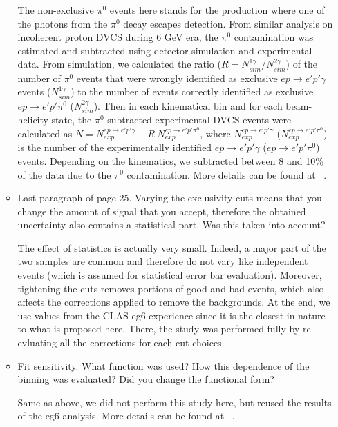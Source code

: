 \begin{itemize}
\begin{itemize}
      {\color{red} The non-exclusive $\pi^0$ events here stands for the 
      production where one of the photons from the $\pi^0$ decay escapes 
      detection. From similar analysis on incoherent proton DVCS during 6 GeV 
      era, the $\pi^0$ contamination was estimated and subtracted using 
      detector simulation and experimental data. From simulation, we calculated 
      the ratio ($R = N^{1\gamma}_{sim}/N^{2\gamma}_{sim}$) of the number of 
      $\pi^0$ events that were wrongly identified as exclusive $ep\rightarrow 
      e'p'\gamma$ events ($N^{1\gamma}_{sim}$) to the number of events 
      correctly identified as exclusive $ep\rightarrow e'p'\pi^0$ 
      ($N^{2\gamma}_{sim}$).  Then in each kinematical bin and for each 
      beam-helicity state, the $\pi^0$-subtracted experimental DVCS events were 
      calculated as $N = N^{ep\rightarrow e'p'\gamma}_{exp}- R~N^{ep\rightarrow 
      e'p'\pi^0}_{exp}$, where $N^{ep\rightarrow e'p'\gamma}_{exp}$ 
      ($N^{ep\rightarrow e'p'\pi^0}_{exp}$) is the number of the experimentally 
      identified $ep\rightarrow e'p'\gamma$ ($ep\rightarrow e'p'\pi^0$) events.  
      Depending on the kinematics, we subtracted between 8 and 10\% of the data 
      due to the $\pi^0$ contamination. More details can be found at  
      ~\cite{eg6_note}. 

}

   
   \item Last paragraph of page 25. Varying the exclusivity cuts means that you 
      change the amount of signal that you accept, therefore the obtained 
      uncertainty also contains a statistical part. Was this taken into 
      account?


      {\color{red} The effect of statistics is actually very small. Indeed, a 
      major part of the two samples are common and therefore do not vary like 
      independent events (which is assumed for statistical error bar 
      evaluation).  Moreover, tightening the cuts removes portions of good and 
      bad events, which also affects the corrections applied to remove the 
      backgrounds. At the end, we use values from the CLAS eg6 experience since 
      it is the closest in nature to what is proposed here. There, the study 
      was performed fully by re-evluating all the corrections for each cut 
      choices.}

 \item Fit sensitivity. What function was used? How this dependence of the 
    binning was evaluated? Did you change the functional form?

 {\color{red} Same as above, we did not perform this study here, but reused the 
      results of the eg6 analysis. More details can be found at  
      ~\cite{eg6_note}.  }

  \end{itemize}
  
  \end{itemize}
 

